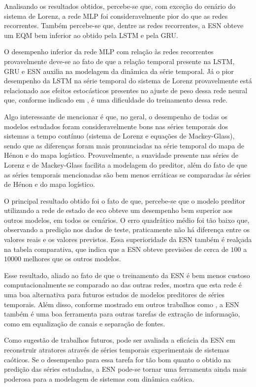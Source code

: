 \documentclass{article}
\begin{document}
Analisando os resultados obtidos, percebe-se que, com exceção do cenário do sistema de Lorenz, a rede MLP foi consideravelmente pior do que as redes recorrentes. Também percebe-se que, dentre as redes recorrentes, a ESN obteve um EQM bem inferior ao obtido pela LSTM e pela GRU.

O desempenho inferior da rede MLP com relação às redes recorrentes provavelmente deve-se ao fato de que a relação temporal presente na LSTM, GRU e ESN auxilia na modelagem da dinâmica da série temporal. Já o pior desempenho da LSTM na série temporal do sistema de Lorenz provavelmente está relacionado aos efeitos estocásticos presentes no ajuste de peso dessa rede neural que, conforme indicado em \cite{doya1992bifurcations}, é uma dificuldade do treinamento dessa rede.

Algo interessante de mencionar é que, no geral, o desempenho de todas os modelos estudados foram consideravelmente bons nas séries temporais dos sistemas a tempo contínuo (sistema de Lorenz e equações de Mackey-Glass), sendo que as diferenças foram mais pronunciadas na série temporal do mapa de Hénon e do mapa logístico. Provavelmente, a suavidade presente nas séries de Lorenz e de Mackey-Glass facilita a modelagem do preditor, além do fato de que as séries temporais mencionadas são bem menos erráticas se comparadas às séries de Hénon e do mapa logístico.

O principal resultado obtido foi o fato de que, percebe-se que o modelo preditor utilizando a rede de estado de eco obteve um desempenho bem superior aos outros modelos, em todos os cenários. O erro quadrático médio foi tão baixo que, observando a predição nos dados de teste, praticamente não há diferença entre os valores reais e os valores previstos. Essa superioridade da ESN também é realçada na tabela comparativa, que indica que a ESN obteve previsões de cerca de $100$ a $10000$ melhores que os outros modelos.

Esse resultado, aliado ao fato de que o treinamento da ESN é bem menos custoso computacionalmente se comparado ao das outras redes, mostra que esta rede é uma boa alternativa para futuros estudos de modelos preditores de séries temporais. Além disso, conforme mostrado em outros trabalhos como \cite{jaeger2004harnessing, jaeger2007echo, boccato2013novas}, a ESN também é uma boa ferramenta para outras tarefas de extração de informação, como em equalização de canais e separação de fontes. 

Como sugestão de trabalhos futuros, pode ser avaliada a eficácia da ESN em reconstruir atratores através de séries temporais experimentais de sistemas caóticos. Se o desempenho para essa tarefa for tão bom quanto o obtido na predição das séries estudadas, a ESN pode-se tornar uma ferramenta ainda mais poderosa para a modelagem de sistemas com dinâmica caótica.


{\scriptsize

}
\end{document}
